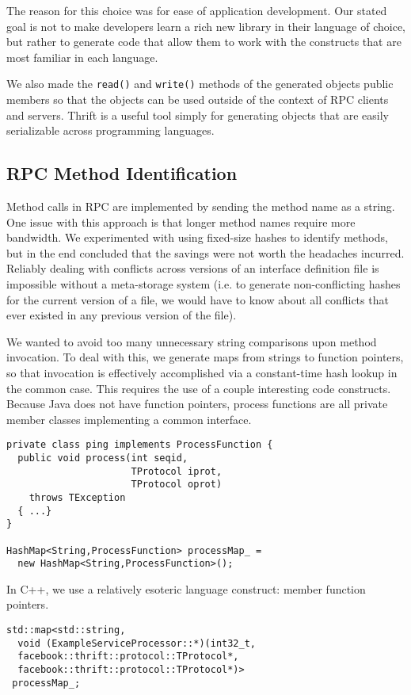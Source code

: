 \documentclass[nocopyrightspace,blockstyle]{sigplanconf}
\begin{document}
The reason for this choice was for ease of application development. Our stated
goal is not to make developers learn a rich new library in their language of
choice, but rather to generate code that allow them to work with the constructs
that are most familiar in each language.

We also made the \texttt{read()} and \texttt{write()} methods of the generated
objects public members so that the objects can be used outside of the context
of RPC clients and servers. Thrift is a useful tool simply for generating
objects that are easily serializable across programming languages.

\subsection{RPC Method Identification}
Method calls in RPC are implemented by sending the method name as a string. One
issue with this approach is that longer method names require more bandwidth.
We experimented with using fixed-size hashes to identify methods, but in the
end concluded that the savings were not worth the headaches incurred. Reliably
dealing with conflicts across versions of an interface definition file is
impossible without a meta-storage system (i.e. to generate non-conflicting
hashes for the current version of a file, we would have to know about all
conflicts that ever existed in any previous version of the file).

We wanted to avoid too many unnecessary string comparisons upon
method invocation. To deal with this, we generate maps from strings to function
pointers, so that invocation is effectively accomplished via a constant-time
hash lookup in the common case. This requires the use of a couple interesting
code constructs. Because Java does not have function pointers, process
functions are all private member classes implementing a common interface.

\begin{verbatim}
private class ping implements ProcessFunction {
  public void process(int seqid,
                      TProtocol iprot,
                      TProtocol oprot)
    throws TException
  { ...}
}

HashMap<String,ProcessFunction> processMap_ =
  new HashMap<String,ProcessFunction>();
\end{verbatim}

In C++, we use a relatively esoteric language construct: member function
pointers.

\begin{verbatim}
std::map<std::string,
  void (ExampleServiceProcessor::*)(int32_t,
  facebook::thrift::protocol::TProtocol*,
  facebook::thrift::protocol::TProtocol*)>
 processMap_;
\end{verbatim}
\end{document}
